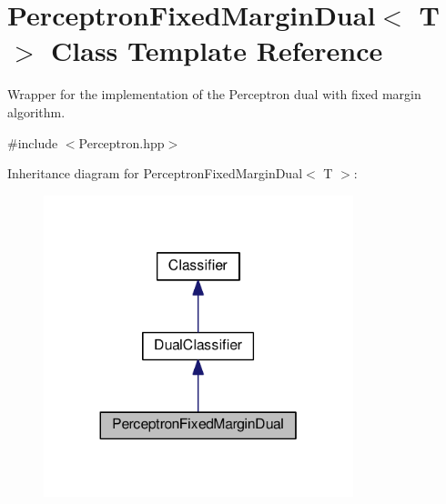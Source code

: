 \hypertarget{class_perceptron_fixed_margin_dual}{}\section{Perceptron\+Fixed\+Margin\+Dual$<$ T $>$ Class Template Reference}
\label{class_perceptron_fixed_margin_dual}


Wrapper for the implementation of the Perceptron dual with fixed margin algorithm.  




{\ttfamily \#include $<$Perceptron.\+hpp$>$}



Inheritance diagram for Perceptron\+Fixed\+Margin\+Dual$<$ T $>$\+:
\nopagebreak
\begin{figure}[H]
\begin{center}
\leavevmode
\includegraphics[width=255pt]{class_perceptron_fixed_margin_dual__inherit__graph}
\end{center}
\end{figure}


